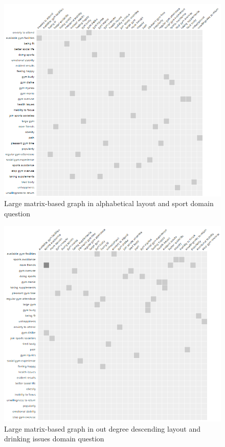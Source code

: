\documentclass{l4proj}
\begin{document}
\begin{appendices}
\begin{figure}[H]
\centering
\includegraphics[width=16cm]{images/gymLargeAlpha.PNG}
\caption{Large matrix-based graph in alphabetical layout and sport domain question}
\label{gymLargeAlpha}
\end{figure}


\begin{figure}[H]
\centering
\includegraphics[width=16cm]{images/gymLargeOutDD.PNG}
\caption{Large matrix-based graph in out degree descending layout and drinking issues domain question}
\label{gymLargeOutDD}
\end{figure}


\end{appendices}
\end{document}
